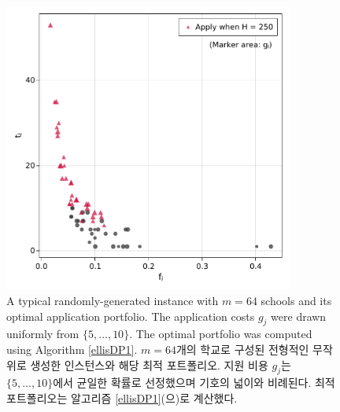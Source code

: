 \documentclass[11pt]{article} %
\theoremstyle{definition}
\theoremstyle{definition}
\begin{document}
\newcommand{\lastptofcaption}{\ifen
For each value of $m$, \nmarkets~markets were generated, and the computation time was recorded as fastest of three repetitions of the algorithm. The table shows the average time (standard deviation) over the \nmarkets~instances.
\else 각 $m$에 대해 \nmarkets 개의 시장을 생성했으며 알고리즘을 3번 반복하여 그중 최소 계산 시간을 기록했다. 표에서 \nmarkets 개의 인스턴스에 대한 평균 (표준편차) 시간이 나타난다.\fi}



\begin{figure}[h!] 
\centering
\includegraphics[width=0.85\textwidth]{./plots/samplemarket.pdf}
  \caption{\label{samplemarket}
 \ifen A typical randomly-generated instance with $m=64$ schools and its optimal application portfolio. The application costs $g_j$ were drawn uniformly from $\{5, \dots, 10\}$. The optimal portfolio was computed using Algorithm \ref{ellisDP1}.
 \else $m=64$개의 학교로 구성된 전형적인 무작위로 생성한 인스턴스와 해당 최적 포트폴리오. 지원 비용 $g_j$는 $\{5, \dots, 10\}$에서 균일한 확률로 선정했으며 기호의 넓이와 비례된다. 최적 포트폴리오는 알고리즘 \ref{ellisDP1}(으)로 계산했다. \fi}
\end{figure}
\end{document}
